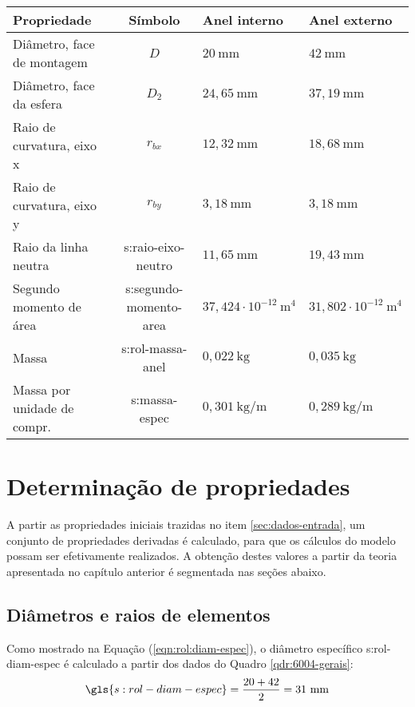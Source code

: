 \documentclass[12pt,oneside,english,brazil,lmodern,siglas,simbolos,cite=num]{ucsmonograph}
\begin{document}
	\begin{quadro}[b]
	\def\arraystretch{1.2}
	\caption{Dados dos anéis do rolamento 6004-2RSH}
	\begin{tabular}{l|c|l|l}
	\hline
	\textbf{Propriedade} & \textbf{Símbolo} & \textbf{Anel interno} & \textbf{Anel externo} \\\hline\hline
	Diâmetro, face de montagem & $D$ & $20\ \text{mm}$ & $ 42\ \text{mm}$ \\\hline
	Diâmetro, face da esfera & $D_2$ & $24,65\ \text{mm}$ & $37,19\ \text{mm}$ \\\hline
	Raio de curvatura, eixo x & $r_{bx}$ & $12,32\ \text{mm}$ & $18,68\ \text{mm}$ \\\hline
	Raio de curvatura, eixo y & $r_{by}$ & $3,18\ \text{mm}$ & $3,18\ \text{mm}$ \\\hline
	Raio da linha neutra & \gls{s:raio-eixo-neutro} & $11,65\ \text{mm}$ & $19,43\ \text{mm}$ \\\hline
	Segundo momento de área & \gls{s:segundo-momento-area} & $37,424\cdot 10^{-12}\ \text{m}^4$ & $31,802\cdot 10^{-12}\ \text{m}^4$ \\\hline
	Massa & \gls{s:rol-massa-anel} & $0,022\ \text{kg}$ & $0,035\ \text{kg}$ \\\hline
	Massa por unidade de compr. & \gls{s:massa-espec} & $0,301\ \text{kg/m}$ & $0,289\ \text{kg/m}$ \\\hline
	\end{tabular}
	\label{qdr:6004-aneis}
	\end{quadro}

	\begin{figure}[t]
		\label{fig:3d-rolamento}
	\end{figure}

	\section{Determinação de propriedades}
	A partir as propriedades iniciais trazidas no item \ref{sec:dados-entrada}, um conjunto de propriedades derivadas é calculado, para que os cálculos do modelo possam ser efetivamente realizados.
	A obtenção destes valores a partir da teoria apresentada no capítulo anterior é segmentada nas seções abaixo.

	\subsection{Diâmetros e raios de elementos}	
	Como mostrado na Equação (\ref{eqn:rol:diam-espec}), o diâmetro específico \gls{s:rol-diam-espec} é calculado a partir dos dados do Quadro \ref{qdr:6004-gerais}:
	\begin{equation*}
		\gls{s:rol-diam-espec} = \frac{20 + 42}{2} = 31\ \text{mm}
	\end{equation*}
	
\end{document}

